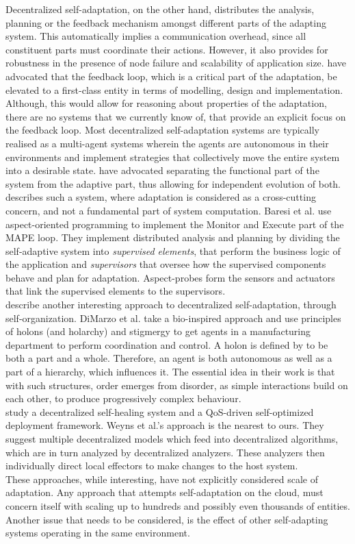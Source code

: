 \documentclass[10pt,journal,compsoc]{IEEEtran}
\begin{document}
Decentralized self-adaptation, on the other hand, distributes the analysis, planning or the feedback mechanism amongst different parts of the adapting system. This automatically implies a communication overhead, since all constituent parts must coordinate their actions. However, it also provides for robustness in the presence of node failure and scalability of application size. \cite{Cheng2009Softwarea} have advocated that the feedback loop, which is a critical part of the adaptation, be elevated to a first-class entity in terms of modelling, design and implementation. Although, this would allow for reasoning about properties of the adaptation, there are no systems that we currently know of, that provide an explicit focus on the feedback loop. Most decentralized self-adaptation systems are typically realised as a multi-agent systems wherein the agents are autonomous in their environments and implement strategies that collectively move the entire system into a desirable state. \cite{Cheng2005Making} have advocated separating the functional part of the system from the adaptive part, thus allowing for independent evolution of both. \cite{Baresi2008Towards} describes such a system, where adaptation is considered as a cross-cutting concern, and not a fundamental part of system computation. Baresi et al. use aspect-oriented programming to implement the Monitor and Execute part of the MAPE loop. They implement distributed analysis and planning by dividing the self-adaptive system into \textit{supervised elements}, that perform the business logic of the application and \textit{supervisors} that oversee how the supervised components behave and plan for adaptation. Aspect-probes form the sensors and actuators that link the supervised elements to the supervisors. \\
\cite{Di2005Self-organization} describe another interesting approach to decentralized self-adaptation, through self-organization. DiMarzo et al. take a bio-inspired approach and use principles of holons (and holarchy) and stigmergy to get agents in a manufacturing department to perform coordination and control. A holon is defined by \cite{Koestler1990Ghost} to be both a part and a whole. Therefore, an agent is both autonomous as well as a part of a hierarchy, which influences it. The essential idea in their work is that with such structures, order emerges from disorder, as simple interactions build on each other, to produce progressively complex behaviour.\\
\cite{Weyns2010decentralized} study a decentralized self-healing system and a QoS-driven self-optimized deployment framework. Weyns et al.'s approach is the nearest to ours. They suggest multiple decentralized models which feed into decentralized algorithms, which are in turn analyzed by decentralized analyzers. These analyzers then individually direct local effectors to make changes to the host system.\\
These approaches, while interesting, have not explicitly considered scale of adaptation. Any approach that attempts self-adaptation on the cloud, must concern itself with scaling up to hundreds and possibly even thousands of entities. Another issue that needs to be considered, is the effect of other self-adapting systems operating in the same environment. 
 
\end{document}
